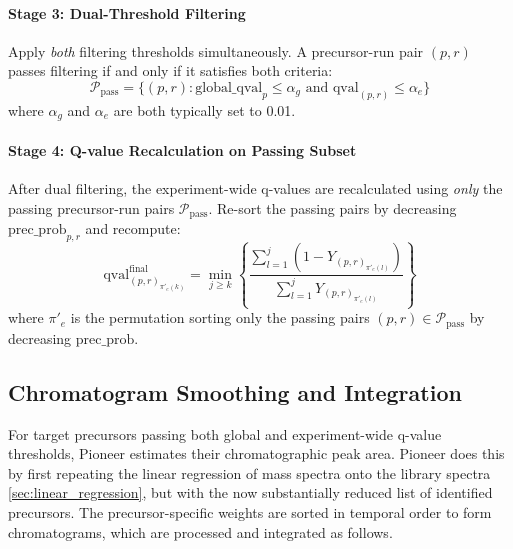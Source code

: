 \documentclass[pdflatex,sn-nature]{sn-jnl}
\begin{document}
\paragraph{Stage 3: Dual-Threshold Filtering}\label{para:stage3-dual-threshold-filtering}
Apply \emph{both} filtering thresholds simultaneously. A precursor-run pair $(p,r)$ passes filtering if and only if it satisfies both criteria:
\begin{equation}
  \mathcal{P}_{\text{pass}} = \{(p,r) : \text{global\_qval}_p \leq \alpha_g \text{ and } \text{qval}_{(p,r)} \leq \alpha_e\}
\end{equation}
where $\alpha_g$ and $\alpha_e$ are both typically set to 0.01.

\paragraph{Stage 4: Q-value Recalculation on Passing Subset}\label{para:stage4-qvalue-recalculation}
After dual filtering, the experiment-wide q-values are recalculated using \emph{only} the passing precursor-run pairs $\mathcal{P}_{\text{pass}}$. Re-sort the passing pairs by decreasing $\text{prec\_prob}_{p,r}$ and recompute:
\begin{equation}
  \text{qval}_{(p,r)_{\pi'_e(k)}}^{\text{final}} = \min_{j \geq k} \left\{ \frac{\sum_{l=1}^{j} (1 - Y_{(p,r)_{\pi'_e(l)}})}{\sum_{l=1}^{j} Y_{(p,r)_{\pi'_e(l)}}} \right\}
\end{equation}
where $\pi'_e$ is the permutation sorting only the passing pairs $(p,r) \in \mathcal{P}_{\text{pass}}$ by decreasing $\text{prec\_prob}$.


\subsection{Chromatogram Smoothing and Integration}\label{subsec:chromatogram-smoothing-integration}

For target precursors passing both global and experiment-wide q-value thresholds, Pioneer estimates their chromatographic peak area. Pioneer does this by first repeating the linear regression of mass spectra onto the library spectra \ref{sec:linear_regression}, but with the now substantially reduced list of identified precursors. The precursor-specific weights are sorted in temporal order to form chromatograms, which are processed and integrated as follows.
\end{document}
